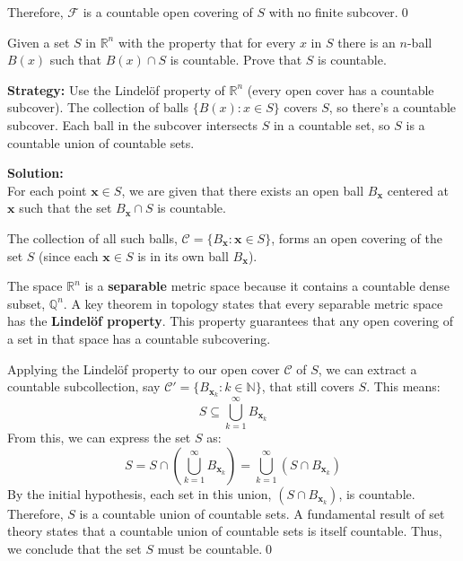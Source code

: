 Therefore, $\mathcal{F}$ is a countable open covering of $S$ with no finite subcover.\qed


\begin{problembox}
\begin{problemstatement}
Given a set \( S \) in \( \mathbb{R}^n \) with the property that for every \( x \) in \( S \) there is an \( n \)-ball \( B(x) \) such that \( B(x) \cap S \) is countable. Prove that \( S \) is countable.
\end{problemstatement}
\end{problembox}

\noindent\textbf{Strategy:} Use the Lindelöf property of $\mathbb{R}^n$ (every open cover has a countable subcover). The collection of balls $\{B(x) : x \in S\}$ covers $S$, so there's a countable subcover. Each ball in the subcover intersects $S$ in a countable set, so $S$ is a countable union of countable sets.

\bigskip\noindent\textbf{Solution:}\\
For each point $\mathbf{x} \in S$, we are given that there exists an open ball $B_\mathbf{x}$ centered at $\mathbf{x}$ such that the set $B_\mathbf{x} \cap S$ is countable.

The collection of all such balls, $\mathcal{C} = \{B_\mathbf{x} : \mathbf{x} \in S\}$, forms an open covering of the set $S$ (since each $\mathbf{x} \in S$ is in its own ball $B_\mathbf{x}$).

The space $\mathbb{R}^n$ is a \textbf{separable} metric space because it contains a countable dense subset, $\mathbb{Q}^n$. A key theorem in topology states that every separable metric space has the \textbf{Lindelöf property}. This property guarantees that any open covering of a set in that space has a countable subcovering.

Applying the Lindelöf property to our open cover $\mathcal{C}$ of $S$, we can extract a countable subcollection, say $\mathcal{C}' = \{B_{\mathbf{x}_k} : k \in \mathbb{N}\}$, that still covers $S$. This means:
$$S \subseteq \bigcup_{k=1}^{\infty} B_{\mathbf{x}_k}$$
From this, we can express the set $S$ as:
$$S = S \cap \left( \bigcup_{k=1}^{\infty} B_{\mathbf{x}_k} \right) = \bigcup_{k=1}^{\infty} (S \cap B_{\mathbf{x}_k})$$
By the initial hypothesis, each set in this union, $(S \cap B_{\mathbf{x}_k})$, is countable.
Therefore, $S$ is a countable union of countable sets. A fundamental result of set theory states that a countable union of countable sets is itself countable. Thus, we conclude that the set $S$ must be countable.\qed


